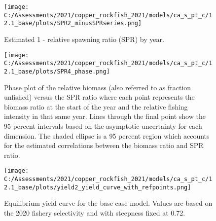 \documentclass[11pt,
  english,
  a4paper,
]{article}
\begin{document}
\begin{figure}
\centering
\texttt{[image: C:/Assessments/2021/copper\_rockfish\_2021/models/ca\_s\_pt\_c/12.1\_base/plots/SPR2\_minusSPRseries.png]}
\caption{Estimated 1 - relative spawning ratio (SPR) by year.\label{fig:1-spr}}
\end{figure}

\tagmcend\tagstructend


\begin{figure}
\centering
\texttt{[image: C:/Assessments/2021/copper\_rockfish\_2021/models/ca\_s\_pt\_c/12.1\_base/plots/SPR4\_phase.png]}
\caption{Phase plot of the relative biomass (also referred to as fraction unfished) versus the SPR ratio where each point represents the biomass ratio at the start of the year and the relative fishing intensity in that same year. Lines through the final point show the 95 percent intervals based on the asymptotic uncertainty for each dimension. The shaded ellipse is a 95 percent region which accounts for the estimated correlations between the biomass ratio and SPR ratio.\label{fig:phase}}
\end{figure}

\tagmcend\tagstructend


\begin{figure}
\centering
\texttt{[image: C:/Assessments/2021/copper\_rockfish\_2021/models/ca\_s\_pt\_c/12.1\_base/plots/yield2\_yield\_curve\_with\_refpoints.png]}
\caption{Equilibrium yield curve for the base case model. Values are based on the 2020 fishery selectivity and with steepness fixed at 0.72.\label{fig:yield}}
\end{figure}
\end{document}
